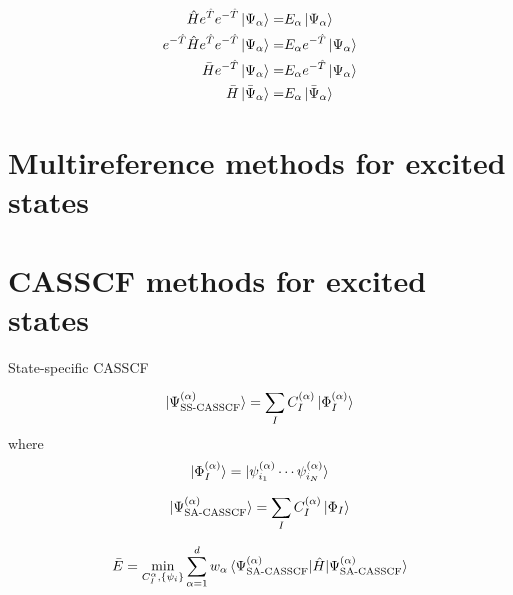 \documentclass[../Main/chem532-notes.tex]{subfiles}
\begin{document}
\begin{equation}
\begin{split}
\hat{H}  e^{\hat{T}} e^{-\hat{T}} \ket{\Psi_\alpha} = & E_\alpha \ket{\Psi_\alpha} \\
e^{-\hat{T}} \hat{H}  e^{\hat{T}} e^{-\hat{T}} \ket{\Psi_\alpha} = & E_\alpha e^{-\hat{T}} \ket{\Psi_\alpha} \\
\bar{H} e^{-\hat{T}} \ket{\Psi_\alpha} = & E_\alpha e^{-\hat{T}} \ket{\Psi_\alpha} \\
\bar{H} \ket{\bar{\Psi}_\alpha} = & E_\alpha \ket{\bar{\Psi}_\alpha} \\
\end{split}
\end{equation}


\section{Multireference methods for excited states}




\section{CASSCF methods for excited states}
State-specific CASSCF

\begin{equation}
\ket{\Psi_\text{SS-CASSCF}^{(\alpha)}} 
= \sum_I C_I^{(\alpha)} \ket{\Phi^{(\alpha)}_I}
\end{equation}
where
\begin{equation}
\ket{\Phi^{(\alpha)}_I} =  \ket{\psi^{(\alpha)}_{i_1} \cdots \psi^{(\alpha)}_{i_N}}
\end{equation}


\begin{equation}
\ket{\Psi_\text{SA-CASSCF}^{(\alpha)}} 
= \sum_I C_I^{(\alpha)} \ket{\Phi_I}
\end{equation}

\begin{equation}
\bar{E} = \min_{C_I^{\alpha}, \{ \psi_i \}} \sum_{\alpha = 1}^{d}
w_\alpha \braket{\Psi_\text{SA-CASSCF}^{(\alpha)} | \hat{H} | \Psi_\text{SA-CASSCF}^{(\alpha)}} 
\end{equation}
\end{document}
